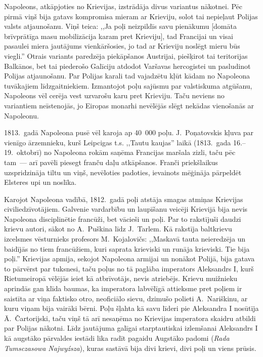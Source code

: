 \documentclass[twoside,a5paper,12pt,fleqn,openany]{extbook}
\newcommand{\pltxti}[1]{\textit{\textpolish{#1}}}
\begin{document}
Napoleons, atkāpjoties no Krievijas, izstrādāja divus variantus nākotnei. Pēc pirmā viņš bija gatavs kompromisa mieram ar Krieviju, solot tai nepieļaut Polijas valsts atjaunošanu. Viņš teica: ,,Ja poļi neizpildīs savu pienākumu [domāta brīvprātīga masu mobilizācija karam pret Krieviju], tad Francijai un visai pasaulei miera jautājums vienkāršosies, jo tad ar Krieviju noslēgt mieru būs viegli.'' Otrais variants paredzēja piekāpšanos Austrijai, piešķirot tai teritorijas Balkānos, bet tai piederošo Galīciju atdodot Varšavas hercogistei un pasludinot Polijas atjaunošanu. Par Polijas karali tad vajadzētu kļūt kādam no Napoleona tuvākajiem līdzgaitniekiem. Izmantojot poļu sajūsmu par valstiskuma atgūšanu, Napoleons vēl cerēja vest uzvarošu karu pret Krieviju. Taču neviens no variantiem neīstenojās, jo Eiropas monarhi nevēlējās slēgt nekādas vienošanās ar Napoleonu.

1813.~gadā Napoleona pusē vēl karoja ap 40~000 poļu. J.~Poņatovskis kļuva par vienīgo ārzemnieku, kurš Leipcigas t.s. ,,Tautu kaujas'' laikā (1813.~gada 16.--19.~oktobrī) no Napoleona rokām saņēma Francijas maršala zizli, taču pēc tam~--- arī pavēli piesegt franču daļu atkāpšanos. Franči priekšlaikus uzspridzināja tiltu un viņš, nevēloties padoties, ievainots mēģināja pārpeldēt Elsteres upi un noslīka.

Karojot Napoleona vadībā, 1812.~gadā poļi atstāja smagas atmiņas Krievijas civiliedzīvotājiem. Galvenie vardarbību un laupīšanu veicēji Krievijā bija nevis Napoleona disciplinētie francūži, bet vācieši un poļi. Par to rakstījuši daudzi krievu autori, sākot no A.~Puškina līdz J.~Tarlem. Kā rakstīja baltkrievu izcelsmes vēsturnieks profesors M.~Kojalovičs: ,,Maskavā tauta neieredzēja un baidījās no tiem francūžiem, kuri saprata krieviski un runāja krieviski. Tie bija poļi.'' Krievijas apmija, sekojot Napoleona armijai un nonākot Polijā, bija gatava to pārvērst par tuksnesi, taču poļus no tā paglāba imperators Aleksandrs I, kurš Rietumeiropā vēlējās ieiet kā atbrīvotājs, nevis atriebējs. Krievu muižnieku aprindās gan klīda baumas, ka imperatora labvēlīgā attieksme pret poļiem ir saistīta ar viņa faktisko otro, neoficiālo sievu, dzimušo polieti A.~Nariškinu, ar kuru viņam bija vairāki bērni. Poļu šļahta kā savu līderi pie Aleksandra I nosūtīja Ā.~Čartorijski, taču viņš tā arī nesaņēma no Krievijas imperatora skaidru atbildi par Polijas nākotni. Līdz jautājuma galīgai starptautiskai izlemšanai Aleksandrs I kā augstāko pārvaldes iestādi lika radīt pagaidu Augstāko padomi (\pltxti{Rada Tumsczasowa Najwyźsza}), kuras sastāvā bija divi krievi, divi poļi un viens prūsis.
\end{document}
